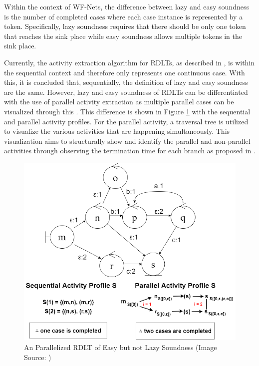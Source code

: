 \begin{rem}
    Within the context of WF-Nets, the difference between lazy and easy soundness is the number of completed cases where each case instance is represented by a token. Specifically, lazy soundness requires that there should be only one token that reaches the sink place while easy soundness allows multiple tokens in the sink place.
    
    Currently, the activity extraction algorithm for RDLTs, as described in \cite{Malinao2017}, is within the sequential context and therefore only represents one continuous case. With this, it is concluded that, sequentially, the definition of lazy and easy soundness are the same. However, lazy and easy soundness of RDLTs can be differentiated with the use of parallel activity extraction as multiple parallel cases can be visualized through this \cite{Doñoz2024}. This difference is shown in Figure \ref{RDLTEasynotLazy} with the sequential and parallel activity profiles. For the parallel activity, a traversal tree is utilized to visualize the various activities that are happening simultaneously. This visualization aims to structurally show and identify the parallel and non-parallel activities through observing the termination time for each branch as proposed in \cite{Doñoz2024}.

    \begin{figure}[H]
        \centering
        \includegraphics[width=16cm]{../figures/RDLT Parallelized Easy not Lazy w Exp.png}
        \caption{An Parallelized RDLT of Easy but not Lazy Soundness (Image Source: \cite{Ramirez2024})}
        \label{RDLTEasynotLazy}
    \end{figure}
\end{rem}
